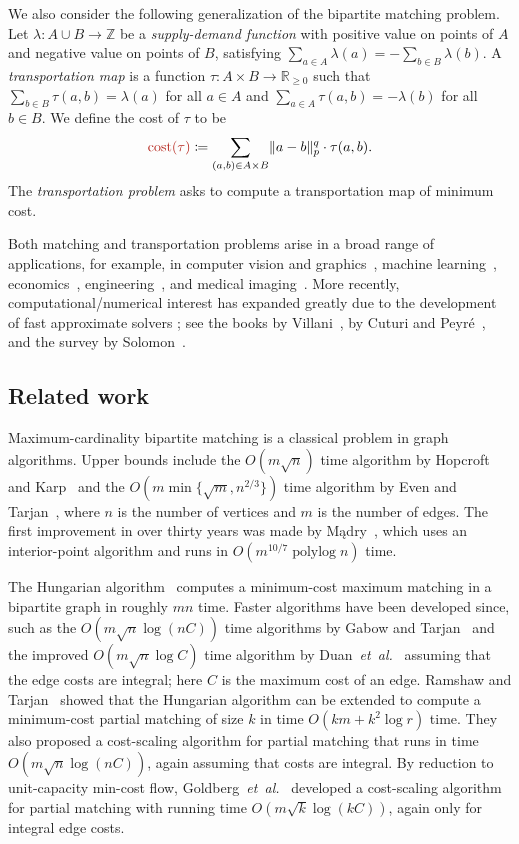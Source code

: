 \documentclass[a4paper,UKenglish]{socg-lipics-v2018}
\def\etal{\emph{et~al.}}
\def\etal{\textit{et~al.}}
\def\polylog{\mathop{\mathrm{polylog}}}
\def\reals{\mathbb{R}}
\def\ints{\mathbb{Z}}
\def\abs#1{\mathopen| #1 \mathclose|}		%
\def\norm#1{\mathopen\| #1 \mathclose\|}	%
\def\tsupply{\lambda}
\def\cost{\operatorname{cost}}
\theoremstyle{plain}
\numberwithin{figure}{section}
\def\EMPH#1{\textcolor{BrickRed}{{\emph{#1}}}}
\begin{document}
We also consider the following generalization of the bipartite matching problem.
Let $\tsupply:A \cup B \to \ints$ be a \EMPH{supply-demand function} with
positive value on points of $A$ and negative value on points of $B$, satisfying
$\sum_{a \in A} \tsupply(a) = - \sum_{b \in B} \tsupply(b)$.
A \EMPH{transportation map} is a function $\tau: A \times B \to \reals_{\geq 0}$
such that $\sum_{b \in B} \tau(a, b) = \tsupply(a)$ for all $a \in A$ and
$\sum_{a \in A} \tau(a, b) = -\tsupply(b)$ for all $b \in B$.
We define the cost of $\tau$ to be
\begin{equation*}
	\EMPH{$\cost(\tau)$} \coloneqq \sum_{(a, b) \in A \times B} \norm{a-b}_p^q \cdot \tau(a, b).
\end{equation*}
The \EMPH{transportation problem} asks to compute a transportation map of minimum cost.

Both matching and transportation problems arise in a broad range of applications,
for example, in
computer vision and graphics~\cite{RTG98,SGPCBNDG15,P15},
machine learning~\cite{BBR06,ACB17},
economics~\cite{G16},
engineering~\cite{O87,STTP14},
and medical imaging~\cite{GPC15}.
More recently, computational/numerical interest has expanded greatly due to
the development of fast approximate solvers \cite{C13,AWR17,DGK18,ABRW18};
see the books by Villani~\cite{V03,V08}, by Cuturi and Peyr{\'e}~\cite{PC18},
and the survey by Solomon~\cite{S18}.

\subsection{Related work}

Maximum-cardinality bipartite matching is a classical problem in graph algorithms.
Upper bounds include the $O(m\sqrt{n})$ time algorithm by
Hopcroft and Karp~\cite{HK73} and the $O(m \min\{\sqrt{m}, n^{2/3}\})$ time
algorithm by Even and Tarjan~\cite{ET75}, where $n$ is the
number of vertices and $m$ is the number of edges.
The first improvement in over thirty years was made by M{\k a}dry~\cite{M13},
which uses an interior-point algorithm and runs in $O(m^{10/7}\polylog n)$ time.

The Hungarian algorithm~\cite{Kuhn55} computes a minimum-cost maximum matching
in a bipartite graph in roughly $mn$ time.
Faster algorithms have been developed since,
such as the $O(m\sqrt{n}\log(nC))$ time algorithms by Gabow and
Tarjan~\cite{GT89} and the improved $O(m\sqrt{n}\log C)$ time algorithm by
Duan~\etal~\cite{DPS11} assuming that the edge costs are integral;
here $C$ is the maximum cost of an edge.
Ramshaw and Tarjan~\cite{RT12} showed that the Hungarian algorithm can be extended to compute a minimum-cost partial
matching of size $k$ in time $O(km + k^2\log r)$ time.
They also proposed a cost-scaling algorithm for partial
matching that runs in time $O(m\sqrt{n}\log(nC))$, again assuming that costs
are integral.
By reduction to unit-capacity min-cost flow, Goldberg~\etal~\cite{GHKT17}
developed a cost-scaling algorithm for partial matching with running time
$O(m\sqrt{k}\log(kC))$,
again only for integral edge costs.
\end{document}
